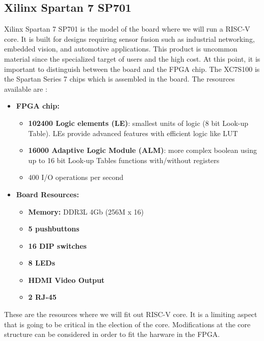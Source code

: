 \subsection{Xilinx Spartan 7 SP701} \label{sec:fpga}
Xilinx Spartan 7 SP701 is the model of the board where we will run a RISC-V core. It is built for designs requiring sensor fusion such as industrial networking, embedded vision, and automotive applications. This product is uncommon material since the specialized target of users and the high cost. At this point, it is important to distinguish between the board and the FPGA chip. The XC7S100 is the Spartan Series 7 chips which is assembled in the board. The resources available are \cite{xilinxsp}:  

\begin{itemize}
	\item \textbf{FPGA chip:}
	\begin{itemize}
		\item \textbf{102400 Logic elements (LE)}: smallest units of logic (8 bit Look-up Table). LEs  provide advanced features with efficient logic like LUT
	   	\item \textbf{16000 Adaptive Logic Module (ALM)}: more complex boolean using up to 16 bit Look-up Tables functions with/without registers
	    	\item 400 I/O operations per second %
	\end{itemize}
	\item \textbf{Board  Resources:}
	\begin{itemize}
		\item \textbf{Memory:} DDR3L 4Gb (256M x 16)
		\item \textbf{5 pushbuttons}
		\item \textbf{16 DIP switches}
		\item \textbf{8 LEDs}
		\item \textbf{HDMI Video Output}
		\item \textbf{2 RJ-45}
		
	\end{itemize}
\end{itemize}

These are the resources where we will fit out RISC-V core. It is a limiting aspect that is going to be critical in the election of the core. Modifications at the core structure can be considered in order to fit the harware in the FPGA. 




